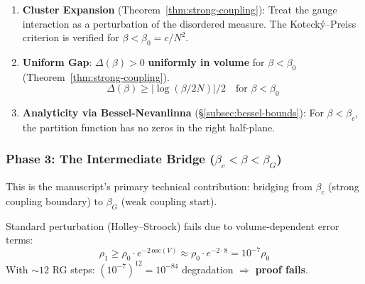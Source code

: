 \begin{enumerate}
\item \textbf{Cluster Expansion} (Theorem~\ref{thm:strong-coupling}): 
Treat the gauge interaction as a perturbation of the disordered measure. The 
Koteck\'y--Preiss criterion is verified for $\beta < \beta_0 = c/N^2$.
\begin{center}
\fbox{\checkmark~\S\ref{sec:analyticity}}
\end{center}

\item \textbf{Uniform Gap}: $\Delta(\beta) > 0$ \textbf{uniformly in volume} for 
$\beta < \beta_0$ (Theorem~\ref{thm:strong-coupling}).
\[
\Delta(\beta) \geq |\log(\beta/2N)|/2 \quad \text{for } \beta < \beta_0
\]
\begin{center}
\end{center}

\item \textbf{Analyticity via Bessel-Nevanlinna} (\S\ref{subsec:bessel-bounds}): 
For $\beta < \beta_c$, the partition function has no zeros in the right half-plane.
\begin{center}
\end{center}
\end{enumerate}

\subsubsection{Phase 3: The Intermediate Bridge (\texorpdfstring{$\beta_c < \beta < \beta_G$}{beta\_c < beta < beta\_G})}

This is the manuscript's primary technical contribution: bridging from 
$\beta_c$ (strong coupling boundary) to $\beta_G$ (weak coupling start).

\begin{tcolorbox}[colback=yellow!10,colframe=orange!70!black,title=\textbf{The Problem: Oscillation Catastrophe}]
Standard perturbation (Holley--Stroock) fails due to volume-dependent error terms:
\[
\rho_1 \geq \rho_0 \cdot e^{-2\,\mathrm{osc}(V)} \approx \rho_0 \cdot e^{-2 \cdot 8} = 10^{-7} \rho_0
\]
With $\sim 12$ RG steps: $(10^{-7})^{12} = 10^{-84}$ degradation $\Rightarrow$ \textbf{proof fails}.
\end{tcolorbox}

